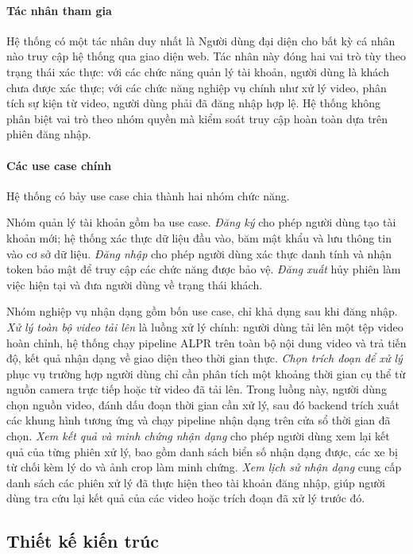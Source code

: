 \documentclass[../DoAn.tex]{subfiles}
\begin{document}
\paragraph{Tác nhân tham gia}
Hệ thống có một tác nhân duy nhất là Người dùng đại diện cho bất kỳ cá nhân nào truy cập hệ thống qua giao diện web. Tác nhân này đóng hai vai trò tùy theo trạng thái xác thực: với các chức năng quản lý tài khoản, người dùng là khách chưa được xác thực; với các chức năng nghiệp vụ chính như xử lý video, phân tích sự kiện từ video, người dùng phải đã đăng nhập hợp lệ. Hệ thống không phân biệt vai trò theo nhóm quyền mà kiểm soát truy cập hoàn toàn dựa trên phiên đăng nhập.

\paragraph{Các use case chính}
Hệ thống có bảy use case chia thành hai nhóm chức năng.

Nhóm quản lý tài khoản gồm ba use case. \textit{Đăng ký} cho phép người dùng tạo tài khoản mới; hệ thống xác thực dữ liệu đầu vào, băm mật khẩu và lưu thông tin vào cơ sở dữ liệu. \textit{Đăng nhập} cho phép người dùng xác thực danh tính và nhận token bảo mật để truy cập các chức năng được bảo vệ. \textit{Đăng xuất} hủy phiên làm việc hiện tại và đưa người dùng về trạng thái khách.

Nhóm nghiệp vụ nhận dạng gồm bốn use case, chỉ khả dụng sau khi đăng nhập. \textit{Xử lý toàn bộ video tải lên} là luồng xử lý chính: người dùng tải lên một tệp video hoàn chỉnh, hệ thống chạy pipeline ALPR trên toàn bộ nội dung video và trả tiến độ, kết quả nhận dạng về giao diện theo thời gian thực. \textit{Chọn trích đoạn để xử lý} phục vụ trường hợp người dùng chỉ cần phân tích một khoảng thời gian cụ thể từ nguồn camera trực tiếp hoặc từ video đã tải lên. Trong luồng này, người dùng chọn nguồn video, đánh dấu đoạn thời gian cần xử lý, sau đó backend trích xuất các khung hình tương ứng và chạy pipeline nhận dạng trên cửa sổ thời gian đã chọn. \textit{Xem kết quả và minh chứng nhận dạng} cho phép người dùng xem lại kết quả của từng phiên xử lý, bao gồm danh sách biển số nhận dạng được, các xe bị từ chối kèm lý do và ảnh crop làm minh chứng. \textit{Xem lịch sử nhận dạng} cung cấp danh sách các phiên xử lý đã thực hiện theo tài khoản đăng nhập, giúp người dùng tra cứu lại kết quả của các video hoặc trích đoạn đã xử lý trước đó.

\subsection{Thiết kế kiến trúc}
\label{subsection:4.1.2}
\end{document}
